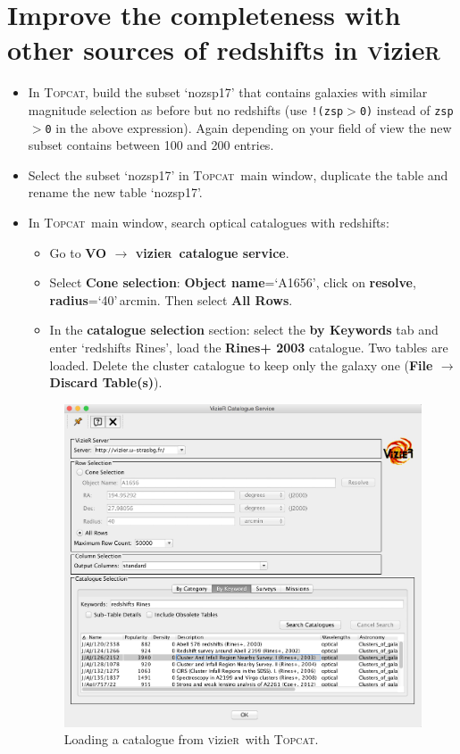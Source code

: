 \documentclass [a4paper, 12pt]{article}
\newcommand{\topcat}{{\textsc{Topcat}}}
\newcommand{\vizier}{{\textsc{v}izie\textsc{r}}}
\begin{document}
\section{Improve the completeness with other sources of redshifts in \vizier}

\begin{itemize}
\item In \topcat, build the subset `nozsp17' that contains galaxies with 
similar magnitude selection as before but no redshifts (use \texttt{!(zsp$>$0)} 
instead of \texttt{zsp$>$0} in the above expression). Again depending on your 
field of view the new subset contains between 100 and 200 entries.
\item Select the subset `nozsp17' in \topcat\ main window, duplicate the table and rename the new table `nozsp17'.
\item In \topcat\ main window, search optical catalogues with redshifts:
\begin{itemize}
    \item Go to \textbf{VO $\rightarrow$ \vizier\ catalogue service}.
    \item Select \textbf{Cone selection}: \textbf{Object name}=`A1656', click 
    on \textbf{resolve}, \textbf{radius}=`40'\,arcmin. Then select \textbf{All 
    Rows}.
    \item In the \textbf{catalogue selection} section: select the \textbf{by 
    Keywords} tab and enter `redshifts Rines', load the \textbf{Rines+ 2003} 
    catalogue. Two tables are loaded. Delete the cluster catalogue to keep only 
    the galaxy one (\textbf{File $\rightarrow$ Discard Table(s)}).
\end{itemize}

\begin{figure}[H]
\center
\includegraphics[width=0.5  \textwidth]{../images/topcat_vizier_rines2003.jpg}
\caption{Loading a catalogue from \vizier\ with \topcat.}
\label{fig:topcatvizier}
\end{figure}


\end{itemize}
\end{document}
